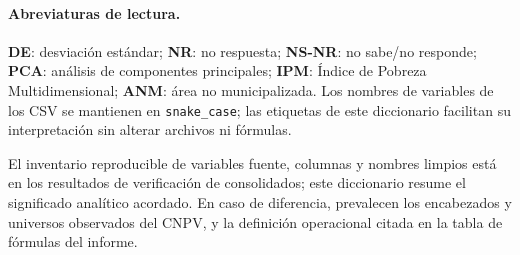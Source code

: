 \paragraph{Abreviaturas de lectura.} \textbf{DE}: desviación estándar; \textbf{NR}: no respuesta; \textbf{NS-NR}: no sabe/no responde; \textbf{PCA}: análisis de componentes principales; \textbf{IPM}: Índice de Pobreza Multidimensional; \textbf{ANM}: área no municipalizada. Los nombres de variables de los CSV se mantienen en \texttt{snake\_case}; las etiquetas de este diccionario facilitan su interpretación sin alterar archivos ni fórmulas.

El inventario reproducible de variables fuente, columnas y nombres limpios está en los resultados de verificación de consolidados; este diccionario resume el significado analítico acordado. En caso de diferencia, prevalecen los encabezados y universos observados del CNPV, y la definición operacional citada en la tabla de fórmulas del informe.

